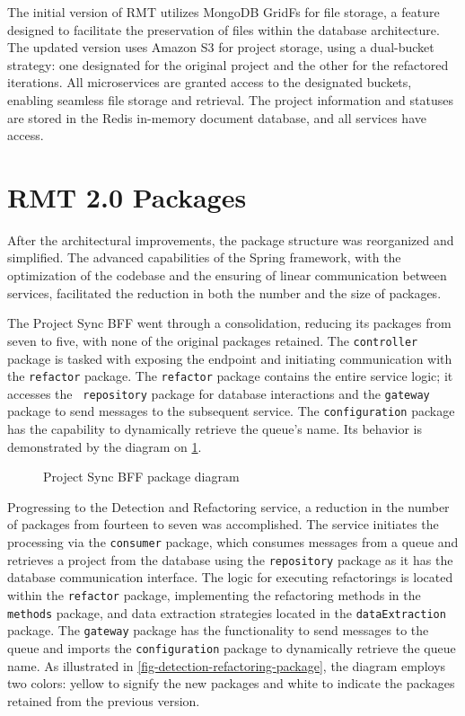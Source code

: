 The initial version of RMT utilizes MongoDB GridFs for file storage, a feature designed to facilitate the preservation of files within the database architecture. The updated version uses Amazon S3 for project storage, using a dual-bucket strategy: one designated for the original project and the other for the refactored iterations. All microservices are granted access to the designated buckets, enabling seamless file storage and retrieval. The project information and statuses are stored in the Redis in-memory document database, and all services have access.

\section{RMT 2.0 Packages}
\label{sec-packages}

After the architectural improvements, the package structure was reorganized and simplified. The advanced capabilities of the Spring framework, with the optimization of the codebase and the ensuring of linear communication between services, facilitated the reduction in both the number and the size of packages.

The Project Sync BFF went through a consolidation, reducing its packages from seven to five, with none of the original packages retained. The \texttt{controller} package is tasked with exposing the endpoint and initiating communication with the \texttt{refactor} package. The \texttt{refactor} package contains the entire service logic; it accesses the \texttt{ repository} package for database interactions and the \texttt{gateway} package to send messages to the subsequent service. The \texttt{configuration} package has the capability to dynamically retrieve the queue's name. Its behavior is demonstrated by the diagram on \cref{fig-project-sync-package}.

\begin{figure}[ht!]
\SetCaptionWidth{\textwidth}
\caption{Project Sync BFF package diagram}
\label{fig-project-sync-package}
\fontsize{8}{10}\selectfont

\end{figure}
\FloatBarrier

Progressing to the Detection and Refactoring service, a reduction in the number of packages from fourteen to seven was accomplished. The service initiates the processing via the \texttt{consumer} package, which consumes messages from a queue and retrieves a project from the database using the \texttt{repository} package as it has the database communication interface. The logic for executing refactorings is located within the \texttt{refactor} package, implementing the refactoring methods in the \texttt{methods} package, and data extraction strategies located in the \texttt{dataExtraction} package. The \texttt{gateway} package has the functionality to send messages to the queue and imports the \texttt{configuration} package to dynamically retrieve the queue name. As illustrated in \cref{fig-detection-refactoring-package}, the diagram employs two colors: yellow to signify the new packages and white to indicate the packages retained from the previous version.

